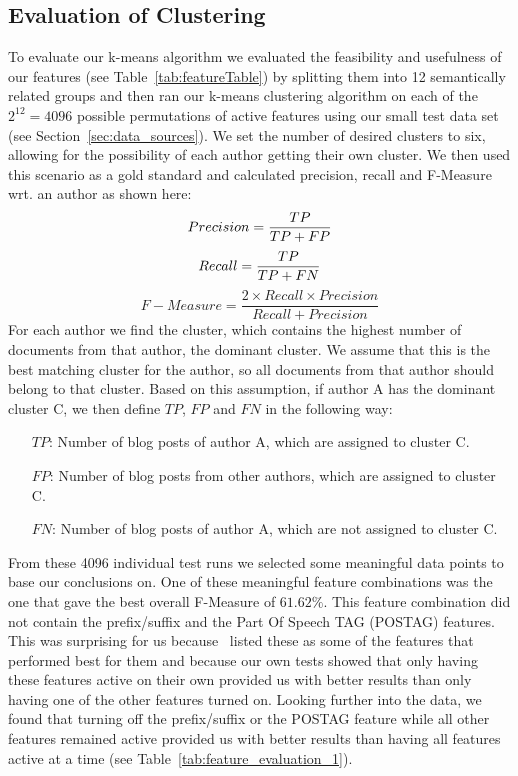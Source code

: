 \subsection{Evaluation of Clustering}
\label{sec:evaluation_clustering}
To evaluate our k-means algorithm we evaluated the feasibility and usefulness of our features (see Table~\ref{tab:featureTable}) by splitting them into 12 semantically related groups and then ran our k-means clustering algorithm on each of the $2^{12} = 4096$ possible permutations of active features using our small test data set (see Section~\ref{sec:data_sources}).
We set the number of desired clusters to six, allowing for the possibility of each author getting their own cluster.
We then used this scenario as a gold standard and calculated precision, recall and F-Measure wrt. an author as shown here:
\begin{equation}
	Precision = \frac{TP}{TP + FP} \\
	\label{eq:precision}
\end{equation}
\begin{equation}
	Recall = \frac{TP}{TP + FN} \\
	\label{eq:recall}
\end{equation}
\begin{equation}
	F-Measure = \frac{2 \times Recall \times Precision}{Recall + Precision}
	\label{eq:fMeasure}
\end{equation}
For each author we find the cluster, which contains the highest number of documents from that author, the dominant cluster.
We assume that this is the best matching cluster for the author, so all documents from that author should belong to that cluster.
Based on this assumption, if author A has the dominant cluster C, we then define $TP$, $FP$ and $FN$ in the following way:
\begin{itemize}
	\item[$TP$:] Number of blog posts of author A, which are assigned to cluster C. \\
	\item[$FP$:] Number of blog posts from other authors, which are assigned to cluster C. \\
	\item[$FN$:] Number of blog posts of author A, which are not assigned to cluster C.
\end{itemize}

From these 4096 individual test runs we selected some meaningful data points to base our conclusions on.
One of these meaningful feature combinations was the one that gave the best overall F-Measure of $61.62\%$.
This feature combination did not contain the prefix/suffix and the Part Of Speech TAG (POSTAG) features.
This was surprising for us because~\cite{madigan2005author} listed these as some of the features that performed best for them and because our own tests showed that only having these features active on their own provided us with better results than only having one of the other features turned on.
Looking further into the data, we found that turning off the prefix/suffix or the POSTAG feature while all other features remained active provided us with better results than having all features active at a time (see Table~\ref{tab:feature_evaluation_1}).

